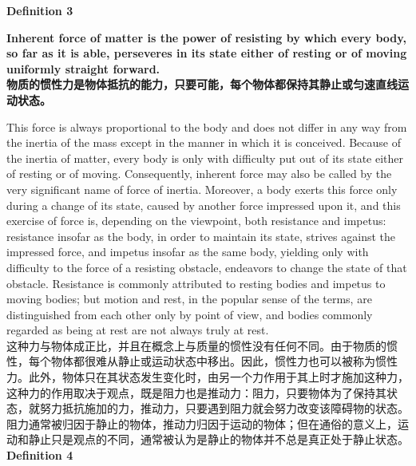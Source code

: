 \documentclass{article}
\begin{document}
\noindent\textbf{Definition 3}

\addtolength{\leftskip}{1cm}
\addtolength{\rightskip}{1cm}

\noindent \textbf{Inherent force of matter is the power of resisting by which every body, so far as it is able, perseveres in its state either of resting or of moving uniformly straight forward.}\\
\noindent \textbf{物质的惯性力是物体抵抗的能力，只要可能，每个物体都保持其静止或匀速直线运动状态。}\\

\addtolength{\leftskip}{-1cm}
\addtolength{\rightskip}{-1cm}

\noindent This force is always proportional to the body and does not differ in any way from the inertia of the mass except in the manner in which it is conceived. Because of the inertia of matter, every body is only with difficulty put out of its state either of resting or of moving. Consequently, inherent force may also be called by the very significant name of force of inertia. Moreover, a body exerts this force only during a change of its state, caused by another force impressed upon it, and this exercise of force is, depending on the viewpoint, both resistance and impetus: resistance insofar as the body, in order to maintain its state, strives against the impressed force, and impetus insofar as the same body, yielding only with difficulty to the force of a resisting obstacle, endeavors to change the state of that obstacle. Resistance is commonly attributed to resting bodies and impetus to moving bodies; but motion and rest, in the popular sense of the terms, are distinguished from each other only by point of view, and bodies commonly regarded as being at rest are not always truly at rest.\\
这种力与物体成正比，并且在概念上与质量的惯性没有任何不同。由于物质的惯性，每个物体都很难从静止或运动状态中移出。因此，惯性力也可以被称为惯性力。此外，物体只在其状态发生变化时，由另一个力作用于其上时才施加这种力，这种力的作用取决于观点，既是阻力也是推动力：阻力，只要物体为了保持其状态，就努力抵抗施加的力，推动力，只要遇到阻力就会努力改变该障碍物的状态。阻力通常被归因于静止的物体，推动力归因于运动的物体；但在通俗的意义上，运动和静止只是观点的不同，通常被认为是静止的物体并不总是真正处于静止状态。\\

\noindent\textbf{Definition 4}

\addtolength{\leftskip}{1cm}
\addtolength{\rightskip}{1cm}
\end{document}
